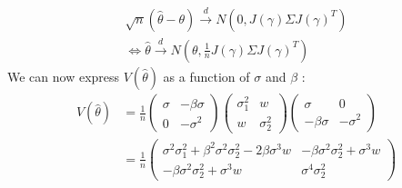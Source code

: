\documentclass{article}
\begin{document}
\begin{equation}
\begin{aligned}
    \sqrt{n}(\hat{\theta} - \theta) \xrightarrow{d} N(0,J(\gamma)\Sigma J(\gamma)^T) \\
    \iff \hat{\theta} \xrightarrow{d} N(\theta, \frac{1}{n}J(\gamma)\Sigma J(\gamma)^T)
\end{aligned}
\end{equation}
We can now express $V(\hat{\theta})$ as a function of $\sigma$ and $\beta$ :
\begin{equation}
\begin{aligned}
    V(\hat{\theta}) &= \frac{1}{n}\begin{pmatrix}
        \sigma & -\beta\sigma\\
        0 & -\sigma^2
    \end{pmatrix} \begin{pmatrix}
        \sigma_1^2 & w\\
        w & \sigma_2^2
    \end{pmatrix} \begin{pmatrix}
        \sigma & 0\\
        -\beta\sigma & -\sigma^2
    \end{pmatrix}\\
    &= \frac{1}{n}\begin{pmatrix}
        \sigma^2\sigma_1^2+\beta^2\sigma^2\sigma_2^2 - 2 \beta\sigma^3w & -\beta\sigma^2\sigma_2^2+\sigma^3w\\
        -\beta\sigma^2\sigma_2^2+\sigma^3w & \sigma^4\sigma_2^2
    \end{pmatrix}
\end{aligned}    
\end{equation}
\end{document}
